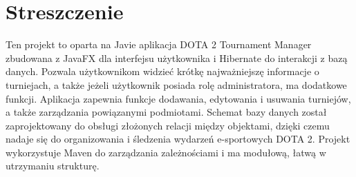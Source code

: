 \chapter{Streszczenie}
\label{cha:streszczenie}

Ten projekt to oparta na Javie aplikacja DOTA 2 Tournament Manager zbudowana z JavaFX dla interfejsu użytkownika i Hibernate do interakcji z bazą danych. Pozwala użytkownikom widzieć krótkę najważniejszę informacje o turniejach, a także jeżeli użytkownik posiada rolę administratora, ma dodatkowe funkcji. Aplikacja zapewnia funkcje dodawania, edytowania i usuwania turniejów, a także zarządzania powiązanymi podmiotami. Schemat bazy danych został zaprojektowany do obsługi złożonych relacji między objektami, dzięki czemu nadaje się do organizowania i śledzenia wydarzeń e-sportowych DOTA 2. Projekt wykorzystuje Maven do zarządzania zależnościami i ma modułową, łatwą w utrzymaniu strukturę.

